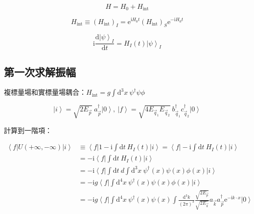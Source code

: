 \documentclass{article}
\begin{document}
$$
H=H_0+H_{\mathrm{int}}
$$

$$
H_{\mathrm{int}}\equiv(H_{\mathrm{int}})_I=\mathrm{e}^{\mathrm{i}H_0t}(H_{\mathrm{int}})_S\mathrm{e}^{-\mathrm{i}H_0t}
$$

$$
\mathrm{i}\frac{\mathrm{d}\left|\psi\right\rangle_I}{\mathrm{d}t}=H_I(t)\left|\psi\right\rangle_I
$$

\subsection{第一次求解振幅}

複標量場和實標量場耦合：$H_{\mathrm{int}}=g\int\mathrm{d}^3x\ \psi^{\dagger}\psi\phi$

$$
\left|i\right\rangle=\sqrt{2E_{\vec{p}}}\ a_{\vec{p}}^{\dagger}\left|0\right\rangle,\ \left|f\right\rangle=\sqrt{4E_{\vec{q}_1}E_{\vec{q}_2}}\ b_{\vec{q}_1}^{\dagger}c_{\vec{q}_2}^{\dagger}\left|0\right\rangle
$$

計算到一階項：

$$
\begin{aligned}
\left\langle f\right|U(+\infty,-\infty)\left|i\right\rangle & \equiv\left\langle f\right|1-\mathrm{i}\int\mathrm{d}t\ H_I(t)\left|i\right\rangle=\left\langle f\right|-\mathrm{i}\int\mathrm{d}t\ H_I(t)\left|i\right\rangle                                                                                     \\
& =-\mathrm{i}\left\langle f\right|\int\mathrm{d}t\ H_I(t)\left|i\right\rangle                                                                                                                                                                       \\
& =-\mathrm{i}\left\langle f\right|\int\mathrm{d}t\ d\int\mathrm{d}^3x\ \psi^{\dagger}(x)\psi(x)\phi(x)\left|i\right\rangle                                                                                                                          \\
& =-\mathrm{i}g\left\langle f\right|\int\mathrm{d}^4x\ \psi^{\dagger}(x)\psi(x)\phi(x)\left|i\right\rangle                                                                                                                                           \\
& =-\mathrm{i}g\left\langle f\right|\int\mathrm{d}^4x\ \psi^{\dagger}(x)\psi(x)\int\frac{\mathrm{d}^3k}{(2\pi)^3}\frac{\sqrt{2E_{\vec{p}}}}{\sqrt{2E_{\vec{k}}}}a_{\vec{k}}a_{\vec{p}}^{\dagger}\mathrm{e}^{-\mathrm{i}k\cdot x}\left|0\right\rangle \\
\end{aligned}
$$
\end{document}

